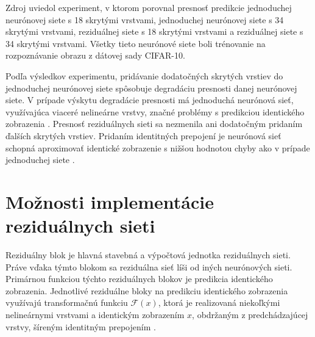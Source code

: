 Zdroj \cite{Wu2017} uviedol experiment, v ktorom porovnal presnosť predikcie jednoduchej neurónovej siete s 18 skrytými vrstvami, jednoduchej neurónovej siete s 34 skrytými vrstvami, reziduálnej siete s 18 skrytými vrstvami a reziduálnej siete s 34 skrytými vrstvami. Všetky tieto neurónové siete boli trénovanie na rozpoznávanie obrazu z dátovej sady CIFAR-10.

Podľa výsledkov experimentu, pridávanie dodatočných skrytých vrstiev do jednoduchej neurónovej siete spôsobuje degradáciu presnosti danej neurónovej siete. V prípade výskytu degradácie presnosti má jednoduchá neurónová sieť, využívajúca viaceré nelineárne vrstvy, značné problémy s predikciou identického zobrazenia \cite{Wu2017}. Presnosť reziduálnych sieti sa nezmenila ani dodatočným pridaním ďalších skrytých vrstiev. Pridaním identitných prepojení je neurónová sieť schopná aproximovať identické zobrazenie s nižšou hodnotou chyby ako v prípade jednoduchej siete \cite{Wu2017}.

\section{Možnosti implementácie reziduálnych sieti}
\label{implementation}

Reziduálny blok je hlavná stavebná a výpočtová jednotka reziduálnych sieti. Práve vďaka týmto blokom sa reziduálna sieť líši od iných neurónových sieti. Primárnou funkciou týchto reziduálnych blokov je predikcia identického zobrazenia. Jednotlivé reziduálne bloky na predikciu identického zobrazenia využívajú transformačnú funkciu $\mathcal{F}(x)$, ktorá je realizovaná niekoľkými nelineárnymi vrstvami a identickým zobrazením $x$, obdržaným z predchádzajúcej vrstvy, šíreným identitným prepojením \cite{He2016}. 


